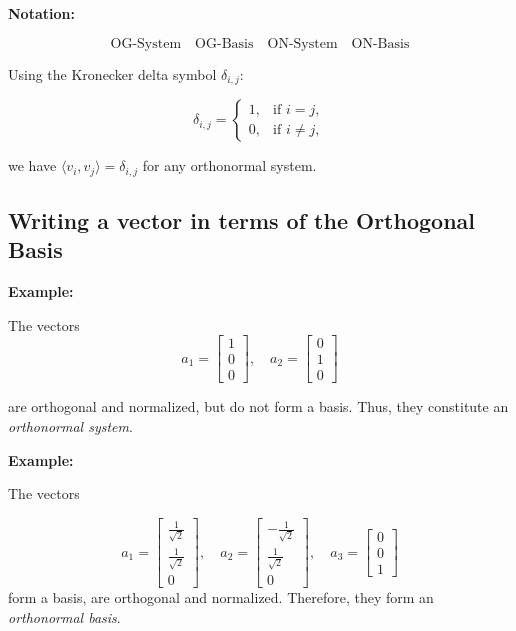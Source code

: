 \textbf{Notation:}

\[
    \text{OG-System} \quad \text{OG-Basis} \quad \text{ON-System} \quad \text{ON-Basis}
\]

Using the Kronecker delta symbol \( \delta_{i,j} \):

\[
    \delta_{i,j} =
    \begin{cases}
    1, & \text{if } i = j, \\
    0, & \text{if } i \neq j,
    \end{cases}
\]

we have \( \langle v_i, v_j \rangle = \delta_{i,j} \) for any orthonormal system.

\subsection{Writing a vector in terms of the Orthogonal Basis}

\textbf{Example:}

The vectors
\[
    a_1 =
    \begin{bmatrix}
    1 \\
    0 \\
    0
    \end{bmatrix}, \quad
    a_2 =
    \begin{bmatrix}
    0 \\
    1 \\
    0
    \end{bmatrix}
\]

are orthogonal and normalized, but do not form a basis. Thus, they constitute an 
\emph{orthonormal system}.

\textbf{Example:}

The vectors

\[
    a_1 =
    \begin{bmatrix}
    \frac{1}{\sqrt{2}} \\
    \frac{1}{\sqrt{2}} \\
    0
    \end{bmatrix}, \quad
    a_2 =
    \begin{bmatrix}
    -\frac{1}{\sqrt{2}} \\
    \frac{1}{\sqrt{2}} \\
    0
    \end{bmatrix}, \quad
    a_3 =
    \begin{bmatrix}
    0 \\
    0 \\
    1
    \end{bmatrix}
\]
form a basis, are orthogonal and normalized. Therefore, they form an \emph{orthonormal basis}.

